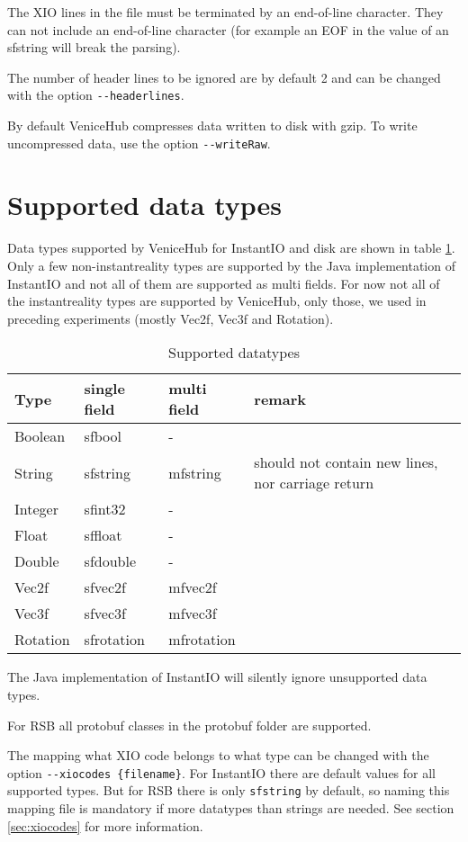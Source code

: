 \documentclass[german,a4paper]{article}
\begin{document}
The XIO lines in the file must be terminated by an end-of-line character. They can not include an end-of-line character (for example an EOF in the value of an sfstring will break the parsing).

The number of header lines to be ignored are by default 2 and can be changed with the option \texttt{-\--headerlines}.

By default VeniceHub compresses data written to disk with gzip. To write uncompressed data, use the option \texttt{-\--writeRaw}.

\section{Supported data types}
\label{sec:types}

Data types supported by VeniceHub for InstantIO and disk are shown in table \ref{tab_datatypes}. Only a few non-instantreality types are supported by the Java implementation of InstantIO and not all of them are supported as multi fields. For now not all of the instantreality types are supported by VeniceHub, only those, we used in preceding experiments (mostly Vec2f, Vec3f and Rotation).
\begin{table}[htbp]
\centering
\begin{tabular}{llll}
Type       &  single field & multi field & remark\\
\hline
Boolean  & sfbool  & - & \\
String   & sfstring & mfstring & should not contain new lines, nor carriage return \\
Integer  & sfint32 & -  & \\
Float    & sffloat & -  & \\
Double   & sfdouble & -  & \\
Vec2f    & sfvec2f & mfvec2f & \\
Vec3f    & sfvec3f & mfvec3f & \\
Rotation & sfrotation & mfrotation & \\
\end{tabular}
\caption{Supported datatypes}
\label{tab_datatypes}
\end{table} 

The Java implementation of InstantIO will silently ignore unsupported data types.

For RSB all protobuf classes in the protobuf folder are supported.

The mapping what XIO code belongs to what type can be changed with the option \texttt{-\--xiocodes \{filename\}}. For InstantIO there are default values for all supported types. But for RSB there is only \texttt{sfstring} by default, so naming this mapping file is mandatory if more datatypes than strings are needed. See section \ref{sec:xiocodes} for more information.
\end{document}
